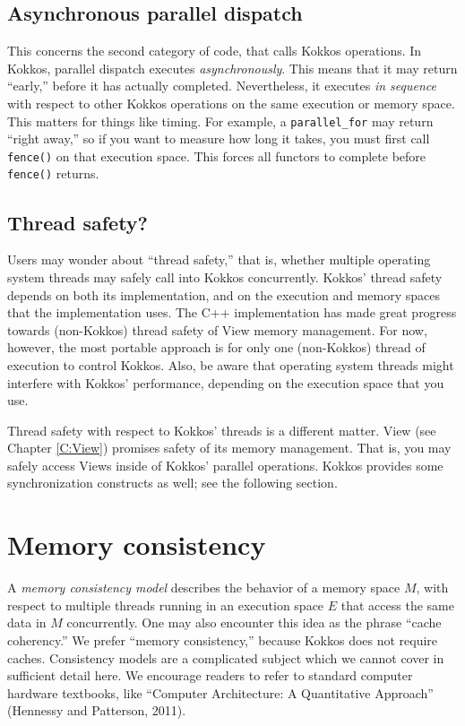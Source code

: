 \subsection{Asynchronous parallel dispatch}\label{SS:Model:Exec:Async}

This concerns the second category of code, that calls Kokkos operations.
In Kokkos, parallel dispatch executes \emph{asynchronously}.  
This means that it may return ``early,'' before it has actually completed.
Nevertheless, it executes \emph{in sequence} with respect to other Kokkos operations on the same execution or memory space.
This matters for things like timing.
For example, a \lstinline!parallel_for! may return ``right away,''
so if you want to measure how long it takes,
you must first call \lstinline!fence()! on that execution space.
This forces all functors to complete before \lstinline!fence()! returns.

\subsection{Thread safety?}\label{SS:Model:Exec:ThreadSafety}

Users may wonder about ``thread safety,'' that is,
whether multiple operating system threads may safely call into Kokkos concurrently.
Kokkos' thread safety depends on both its implementation, 
and on the execution and memory spaces that the implementation uses.
The C++ implementation has made great progress towards (non-Kokkos) thread safety of View memory management.
For now, however, the most portable approach is for only one (non-Kokkos) thread of execution to control Kokkos.
Also, be aware that operating system threads might interfere with Kokkos' performance,
depending on the execution space that you use.

Thread safety with respect to Kokkos' threads is a different matter.
View (see Chapter \ref{C:View}) promises safety of its memory management.
That is, you may safely access Views inside of Kokkos' parallel operations.
Kokkos provides some synchronization constructs as well; see the following section.

\section{Memory consistency}\label{S:Model:Consistency}

A \emph{memory consistency model} describes the behavior of a memory space $M$,
with respect to multiple threads running in an execution space $E$
that access the same data in $M$ concurrently.
One may also encounter this idea as the phrase ``cache coherency.''
We prefer ``memory consistency,'' because Kokkos does not require caches.
Consistency models are a complicated subject which we cannot cover in sufficient detail here.
We encourage readers to refer to standard computer hardware textbooks,
like ``Computer Architecture: A Quantitative Approach'' (Hennessy and Patterson, 2011).

